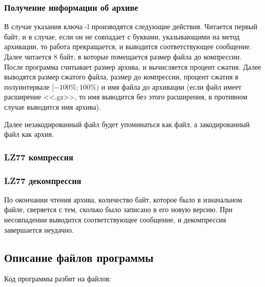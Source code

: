 \documentclass[12pt]{article}
\begin{document}
\subsubsection*{Получение информации об архиве}

В случае указания ключа -l производятся следующие действия. Читается первый байт, и в случае, если он не совпадает с буквами, указывающими на метод архивации, то работа прекращается, и выводится соответствующее сообщение. Далее читается 8 байт, в которые помещается размер файла до компрессии. После программа считывает размер архива, и вычисляется процент сжатия. Далее выводятся размер сжатого файла, размер до компрессии, процент сжатия в полуинтервале $[-100\%; 100\%)$ и имя файла до архивации (если файл имеет расширение <<.gz>>, то имя выводится без этого расширения, в противном случае выводится имя архива).

Далее незакодированный файл будет упоминаться как файл, а закодированный файл как архив.%

\subsubsection*{LZ77 компрессия} %

\subsubsection*{LZ77 декомпрессия}

По окончании чтения архива, количество байт, которое было в изначальном файле, сверяется с тем, сколько было записано в его новую версию. При несовпадении выводится соответствующее сообщение, и декомпрессия завершается неудачно.


\subsection*{Описание файлов программы}

Код программы разбит на %
 файлов:
\end{document}
